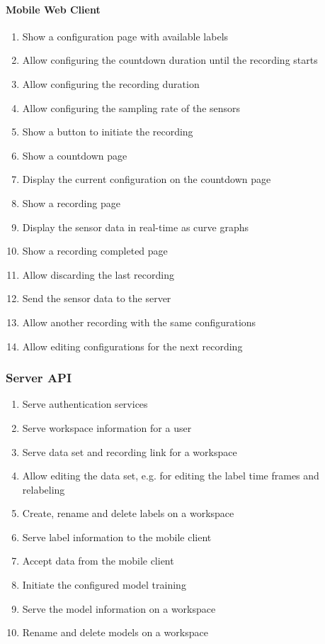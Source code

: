 \paragraph{Mobile Web Client}
\begin{enumerate}[resume*]
    \item Show a configuration page with available labels
    \item Allow configuring the countdown duration until the recording starts
    \item Allow configuring the recording duration
    \item Allow configuring the sampling rate of the sensors
    \item Show a button to initiate the recording
    \item Show a countdown page
    \item Display the current configuration on the countdown page
    \item Show a recording page
    \item Display the sensor data in real-time as curve graphs
    \item Show a recording completed page
    \item Allow discarding the last recording
    \item Send the sensor data to the server
    \item Allow another recording with the same configurations
    \item Allow editing configurations for the next recording
\end{enumerate}

\subsubsection{Server API}
\begin{enumerate}[resume*]
    \item Serve authentication services
    \item Serve workspace information for a user
    \item Serve data set and recording link for a workspace
    \item Allow editing the data set, e.g. for editing the label time frames and relabeling
    \item Create, rename and delete labels on a workspace
    \item Serve label information to the mobile client
    \item Accept data from the mobile client
    \item Initiate the configured model training
    \item Serve the model information on a workspace
    \item Rename and delete models on a workspace
\end{enumerate}

